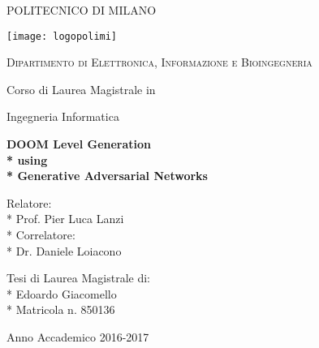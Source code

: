 \begin{titlepage}
	\centering
	
	{\scshape\LARGE POLITECNICO DI MILANO \par}\vspace{0.5cm}
		\texttt{[image: logopolimi]}\par
		\vspace{0.5cm}
	{\scshape\Large Dipartimento di Elettronica, Informazione e Bioingegneria \par}\vspace{1cm}
	\vspace{0.5cm}
	{\Large Corso di Laurea Magistrale in \par}
	{\Large Ingegneria Informatica \par}
	\vspace{1.5cm}
	{\huge\bfseries DOOM Level Generation \\* 
		using \\* Generative Adversarial Networks\par}
	\vspace{2cm}
	 
	\vfill
	\begin{flushleft}
		{\Large 
			Relatore: \\*
			Prof. Pier Luca Lanzi \\*
			Correlatore: \\*
			Dr. Daniele Loiacono
			\par}
	\end{flushleft}
	\begin{flushright}
		{\Large 
			Tesi di Laurea Magistrale di: \\*
			Edoardo Giacomello \\*
			Matricola n. 850136
		}
	\end{flushright}
	 
	\vfill

	{\large Anno Accademico 2016-2017\par}
\end{titlepage}